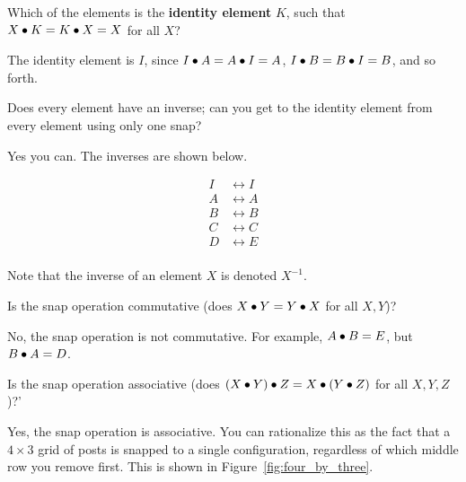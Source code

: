 \documentclass[../gatm_answers.tex]{subfiles}
\begin{document}
\begin{outer_problem}
	\item Which of the elements is the \textbf{identity element} $K$, such that $X\bullet K = K\bullet X = X$ for all $X$? \label{prob:group_definition_start}
\end{outer_problem}

The identity element is $I$, since $I\bullet A = A\bullet I = A$, $I\bullet B = B\bullet I = B$, and so forth.

\begin{outer_problem}
	\item Does every element have an inverse; can you get to the identity element from every element using only one snap?
\end{outer_problem}

Yes you can. The inverses are shown below.

\begin{align*}
I &\leftrightarrow I \\
A &\leftrightarrow A \\
B &\leftrightarrow B \\
C &\leftrightarrow C \\
D &\leftrightarrow E \\
\end{align*}

Note that the inverse of an element $X$ is denoted $X^{-1}$.

\begin{outer_problem}
	\item
\end{outer_problem}

\begin{inner_problem}[start=1]
	\item Is the snap operation commutative (does $X \bullet Y = Y \bullet X$ for all $X,Y$)?
\end{inner_problem}

No, the snap operation is not commutative. For example, $A\bullet B=E$, but $B\bullet A = D$.

\begin{inner_problem}
	\item Is the snap operation associative (does $(X \bullet Y) \bullet Z = X \bullet (Y\bullet Z)$ for all $X,Y,Z$)?'
\end{inner_problem}

Yes, the snap operation is associative. You can rationalize this as the fact that a $4\times 3$ grid of posts is snapped to a single configuration, regardless of which middle row you remove first. This is shown in Figure~\ref{fig:four_by_three}.
\end{document}
